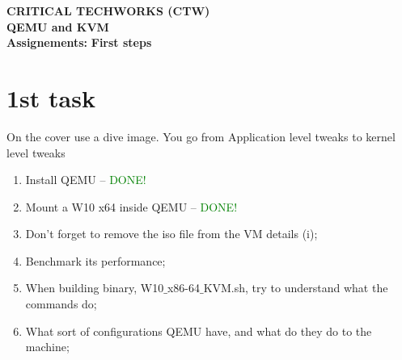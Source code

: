 \documentclass[11pt, a4paper, oneside]{article}
\date{} %
\theoremstyle{definition}
\begin{document}
\sloppy
\justifying


\fancyhead{}

\Large\textbf{CRITICAL TECHWORKS (CTW)}\\
\singlespacing
\Large\textbf{QEMU and KVM}\\

\singlespacing
\singlespacing
\singlespacing
\textbf{Assignements:}
\singlespacing
\indent\indent\indent\indent \textbf{First steps}


\vfill
\pagebreak
\section*{1st task}

On the cover use a dive image. You go from Application level tweaks to kernel level tweaks


\begin{enumerate}
	\item Install QEMU -- \textcolor{green}{DONE!}
	\item Mount a W10 x64 inside QEMU -- \textcolor{green}{DONE!}
	\item Don't forget to remove the iso file from the VM details (i);	
	\item Benchmark its performance;
	\item When building binary, W10$\_$x86-64$\_$KVM.sh, try to understand what the commands do;
	\item What sort of configurations QEMU have, and what do they do to the machine;
\end{enumerate}
\end{document}
